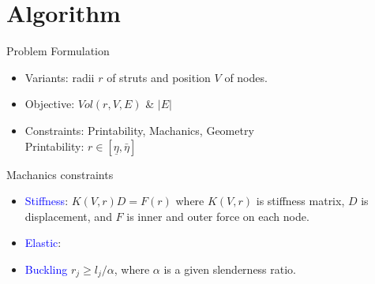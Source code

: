\documentclass{beamer}
\begin{document}
\section{Algorithm}
\begin{frame}{Problem Formulation}
\begin{itemize}
\item Variants: radii $r$ of struts and position $V$ of nodes.
\item Objective: $Vol(r, V, E)$ \& $|E|$
\item Constraints: Printability, Machanics, Geometry\\
Printability: $r\in [\underline{\eta},\bar{\eta}]$
\end{itemize}
\end{frame}

\begin{frame}{Machanics constraints}
\begin{itemize}
\item \textcolor{blue}{Stiffness}: \quad $K(V,r) D = F(r)$ where $K(V,r)$ is stiffness matrix, $D$ is displacement, and $F$ is inner and outer force on each node.
\item \textcolor{blue}{Elastic}: \quad 
{}
\item \textcolor{blue}{Buckling} \quad $r_j\geq l_j/\alpha$, where $\alpha$ is a given slenderness ratio.
\end{itemize}
\end{frame}
\end{document}

